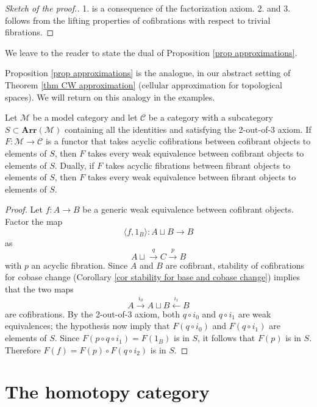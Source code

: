 \begin{refsection}
\begin{proof}[Sketch of the proof.]
1. is a consequence of the factorization axiom. 2. and 3. follows from the lifting properties of cofibrations with respect to trivial fibrations. 
\end{proof}

\begin{rmk}
We leave to the reader to state the dual of Proposition \ref{prop approximations}.
\end{rmk}

\begin{rmk}
Proposition \ref{prop approximations} is the analogue, in our abstract setting of Theorem \ref{thm CW approximation} (cellular approximation for topological spaces). We will return on this analogy in the examples.
\end{rmk}

\begin{lemma} \label{lemma Ken Brown}
Let $\mathcal M$ be a model category and let $\mathcal C$ be a category with a subcategory $S \subset \mathbf{Arr}(\mathcal M)$ containing all the identities and satisfying the 2-out-of-3 axiom. If $F \colon \mathcal M \to \mathcal C$ is a functor that takes acyclic cofibrations between cofibrant objects to elements of $S$, then $F$ takes every weak equivalence between cofibrant objects to elements of $S$. Dually, if $F$ takes acyclic fibrations between fibrant objects to elements of $S$, then $F$ takes every weak equivalence between fibrant objects to elements of $S$.
\end{lemma}

\begin{proof}
Let $f \colon A \to B$ be a generic weak equivalence between cofibrant objects. Factor the map
\[
\langle f, 1_B \rangle \colon A \sqcup B \to B
\]
as
\[
A \sqcup \xrightarrow{q} C \xrightarrow{p} B
\]
with $p$ an acyclic fibration. Since $A$ and $B$ are cofibrant, stability of cofibrations for cobase change (Corollary \ref{cor stability for base and cobase change}) implies that the two maps
\[
A \xrightarrow{i_0} A \sqcup B \xleftarrow{i_1} B
\]
are cofibrations. By the 2-out-of-3 axiom, both $q \circ i_0$ and $q \circ i_1$ are weak equivalences; the hypothesis now imply that $F(q \circ i_0)$ and $F(q \circ i_1)$ are elements of $S$. Since $F(p \circ q \circ i_1) = F(1_B)$ is in $S$, it follows that $F(p)$ is in $S$. Therefore $F(f) = F(p) \circ F(q \circ i_2)$ is in $S$.
\end{proof}

\section{The homotopy category} \label{homotopy category}


\end{refsection}
